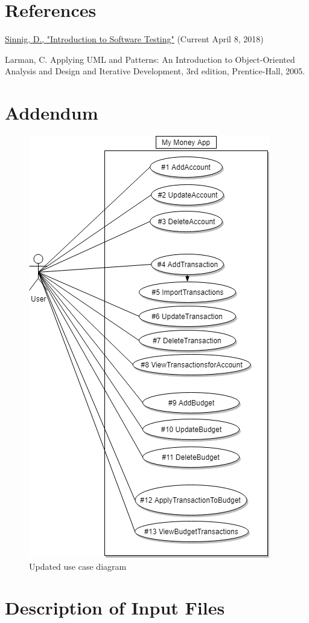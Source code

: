 \documentclass[12pt]{article}
\begin{document}
\section{References}
\href{https://users.encs.concordia.ca/~gregb/home/PDF/comp354-testing-intro.pdf}{Sinnig, D., "Introduction to Software Testing"} (Current April 8, 2018)

Larman, C. Applying UML and Patterns: An Introduction to Object-Oriented Analysis and Design and Iterative Development, 3rd edition, Prentice-Hall, 2005.

\section{Addendum}

\begin{figure}[H]
\centering
\caption{Updated use case diagram}
\includegraphics[scale=0.5]{Diagrams/UML/SOEN.png}
\end{figure}

\section{Description of Input Files}
\end{document}
